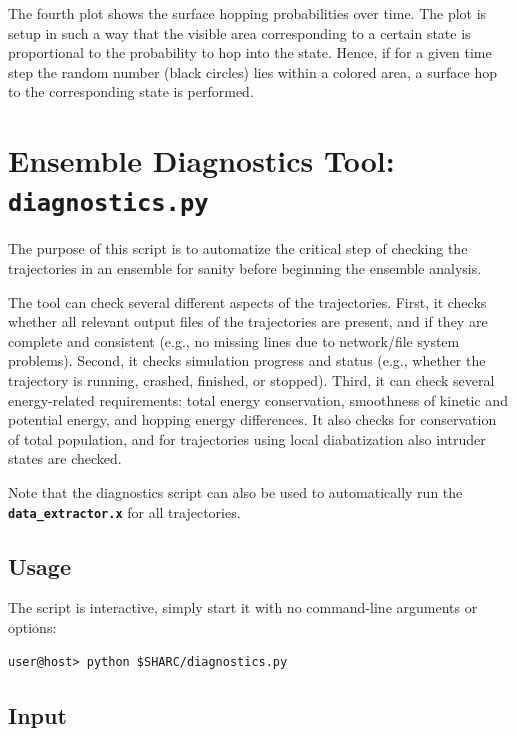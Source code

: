 \documentclass[a4paper,10pt,DIV=15,openany,twoside=false]{scrbook}
\newcommand{\ttt}[1]{\textbf{\texttt{#1}}}
\begin{document}
The fourth plot shows the surface hopping probabilities over time. The plot is setup in such a way that the visible area corresponding to a certain state is proportional to the probability to hop into the state. Hence, if for a given time step the random number (black circles) lies within a colored area, a surface hop to the corresponding state is performed.






\section{Ensemble Diagnostics Tool: \ttt{diagnostics.py}}\label{sec:diagnostics.py}

The purpose of this script is to automatize the critical step of checking the trajectories in an ensemble for sanity before beginning the ensemble analysis.

The tool can check several different aspects of the trajectories.
First, it checks whether all relevant output files of the trajectories are present, and if they are complete and consistent (e.g., no missing lines due to network/file system problems).
Second, it checks simulation progress and status (e.g., whether the trajectory is running, crashed, finished, or stopped).
Third, it can check several energy-related requirements: total energy conservation, smoothness of kinetic and potential energy, and hopping energy differences.
It also checks for conservation of total population, and for trajectories using local diabatization also intruder states are checked.

Note that the diagnostics script can also be used to automatically run the \ttt{data\_extractor.x} for all trajectories.

\subsection{Usage}

The script is interactive, simply start it with no command-line arguments or options:
\begin{verbatim}
user@host> python $SHARC/diagnostics.py
\end{verbatim}

\subsection{Input}
\end{document}
